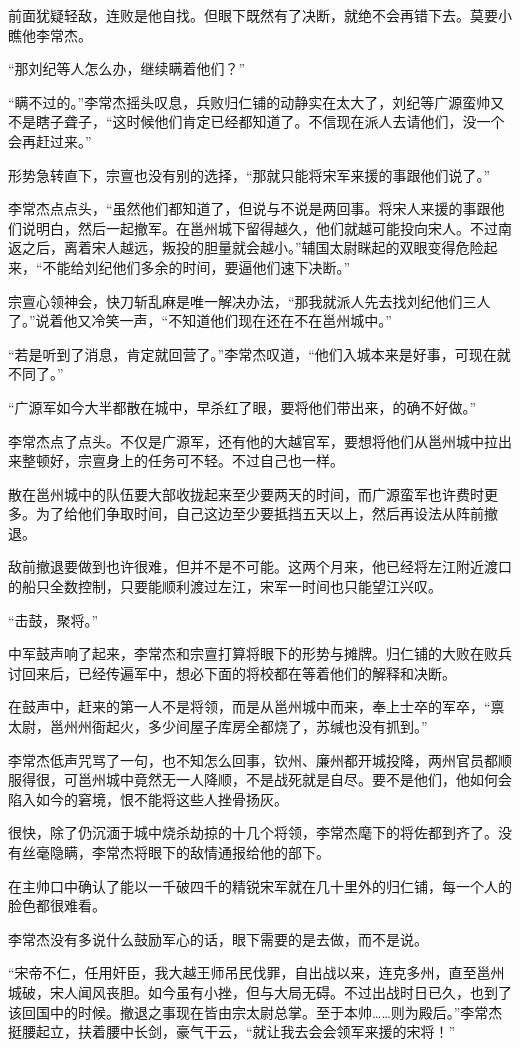 前面犹疑轻敌，连败是他自找。但眼下既然有了决断，就绝不会再错下去。莫要小瞧他李常杰。

“那刘纪等人怎么办，继续瞒着他们？”

“瞒不过的。”李常杰摇头叹息，兵败归仁铺的动静实在太大了，刘纪等广源蛮帅又不是瞎子聋子，“这时候他们肯定已经都知道了。不信现在派人去请他们，没一个会再赶过来。”

形势急转直下，宗亶也没有别的选择，“那就只能将宋军来援的事跟他们说了。”

李常杰点点头，“虽然他们都知道了，但说与不说是两回事。将宋人来援的事跟他们说明白，然后一起撤军。在邕州城下留得越久，他们就越可能投向宋人。不过南返之后，离着宋人越远，叛投的胆量就会越小。”辅国太尉眯起的双眼变得危险起来，“不能给刘纪他们多余的时间，要逼他们速下决断。”

宗亶心领神会，快刀斩乱麻是唯一解决办法，“那我就派人先去找刘纪他们三人了。”说着他又冷笑一声，“不知道他们现在还在不在邕州城中。”

“若是听到了消息，肯定就回营了。”李常杰叹道，“他们入城本来是好事，可现在就不同了。”

“广源军如今大半都散在城中，早杀红了眼，要将他们带出来，的确不好做。”

李常杰点了点头。不仅是广源军，还有他的大越官军，要想将他们从邕州城中拉出来整顿好，宗亶身上的任务可不轻。不过自己也一样。

散在邕州城中的队伍要大部收拢起来至少要两天的时间，而广源蛮军也许费时更多。为了给他们争取时间，自己这边至少要抵挡五天以上，然后再设法从阵前撤退。

敌前撤退要做到也许很难，但并不是不可能。这两个月来，他已经将左江附近渡口的船只全数控制，只要能顺利渡过左江，宋军一时间也只能望江兴叹。

“击鼓，聚将。”

中军鼓声响了起来，李常杰和宗亶打算将眼下的形势与摊牌。归仁铺的大败在败兵讨回来后，已经传遍军中，想必下面的将校都在等着他们的解释和决断。

在鼓声中，赶来的第一人不是将领，而是从邕州城中而来，奉上士卒的军卒，“禀太尉，邕州州衙起火，多少间屋子库房全都烧了，苏缄也没有抓到。”

李常杰低声咒骂了一句，也不知怎么回事，钦州、廉州都开城投降，两州官员都顺服得很，可邕州城中竟然无一人降顺，不是战死就是自尽。要不是他们，他如何会陷入如今的窘境，恨不能将这些人挫骨扬灰。

很快，除了仍沉湎于城中烧杀劫掠的十几个将领，李常杰麾下的将佐都到齐了。没有丝毫隐瞒，李常杰将眼下的敌情通报给他的部下。

在主帅口中确认了能以一千破四千的精锐宋军就在几十里外的归仁铺，每一个人的脸色都很难看。

李常杰没有多说什么鼓励军心的话，眼下需要的是去做，而不是说。

“宋帝不仁，任用奸臣，我大越王师吊民伐罪，自出战以来，连克多州，直至邕州城破，宋人闻风丧胆。如今虽有小挫，但与大局无碍。不过出战时日已久，也到了该回国中的时候。撤退之事现在皆由宗太尉总掌。至于本帅……则为殿后。”李常杰挺腰起立，扶着腰中长剑，豪气干云，“就让我去会会领军来援的宋将！”

